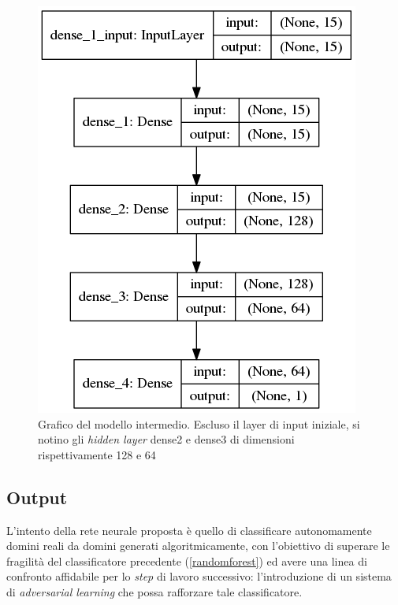 \begin{figure}[!htb]
    \centering
    \includegraphics[width=.6\columnwidth]{figures/pieraz_baseline.png}
    \caption{Grafico del modello intermedio. Escluso il layer di input iniziale, si notino gli \textit{hidden layer} dense2 e dense3 di dimensioni rispettivamente 128 e 64 }
\label{fig:pieraz}
\end{figure}

\subsection{Output}
\label{classificatorennoutput}
L'intento della rete neurale proposta è quello di classificare autonomamente domini reali da domini generati algoritmicamente, con l'obiettivo di superare le fragilità del classificatore precedente (\ref{randomforest}) ed avere una linea di confronto affidabile per lo \textit{step} di lavoro successivo: l'introduzione di un sistema di \textit{adversarial learning} che possa rafforzare tale classificatore. 

